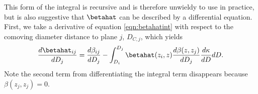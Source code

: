 This form of the integral is recursive and is therefore unwieldy to use in practice, but is also suggestive that $\betahat$ can be described by a differential equation. First, we take a derivative of equation \ref{eqn:betahatint} with respect to the comoving diameter distance to plane $j$, $D_{C,j}$, which yields
\begin{equation}
\frac{d\betahat_{i j}}{d D_j} = \frac{d\beta_{i j}}{d D_j} - \int_{D_i}^{D_j} \betahat(z_i, z) \frac{d \beta(z, z_j)}{d D_j} \frac{d \kappa}{d D} d D.
\end{equation}
Note the second term from differentiating the integral term disappears because $\beta(z_j, z_j) = 0$. 
  
  
  